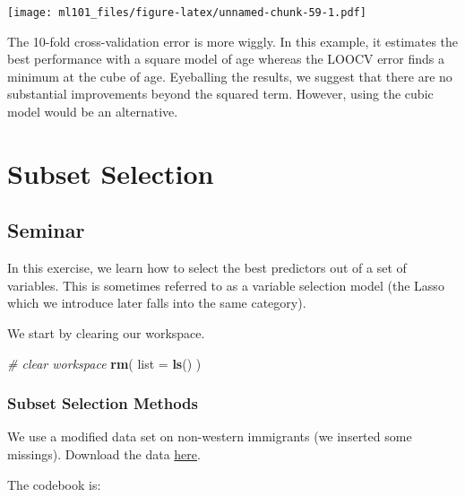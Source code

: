 \documentclass[]{article}
\newenvironment{Shaded}{\begin{snugshade}}{\end{snugshade}}
\newcommand{\CommentTok}[1]{\textcolor[rgb]{0.56,0.35,0.01}{\textit{#1}}}
\newcommand{\DataTypeTok}[1]{\textcolor[rgb]{0.13,0.29,0.53}{#1}}
\newcommand{\KeywordTok}[1]{\textcolor[rgb]{0.13,0.29,0.53}{\textbf{#1}}}
\newcommand{\NormalTok}[1]{#1}
\begin{document}
\texttt{[image: ml101\_files/figure-latex/unnamed-chunk-59-1.pdf]}

The 10-fold cross-validation error is more wiggly. In this example, it estimates the best performance with a square model of age whereas the LOOCV error finds a minimum at the cube of age. Eyeballing the results, we suggest that there are no substantial improvements beyond the squared term. However, using the cubic model would be an alternative.

\hypertarget{subset-selection}{%
\section{Subset Selection}\label{subset-selection}}

\hypertarget{seminar-2}{%
\subsection{Seminar}\label{seminar-2}}

In this exercise, we learn how to select the best predictors out of a set of variables. This is sometimes referred to as a variable selection model (the Lasso which we introduce later falls into the same category).

We start by clearing our workspace.

\begin{Shaded}
\begin{Highlighting}[]
\CommentTok{# clear workspace}
\KeywordTok{rm}\NormalTok{( }\DataTypeTok{list =} \KeywordTok{ls}\NormalTok{() )}
\end{Highlighting}
\end{Shaded}

\hypertarget{subset-selection-methods}{%
\subsubsection{Subset Selection Methods}\label{subset-selection-methods}}

We use a modified data set on non-western immigrants (we inserted some missings). Download the data \href{http://philippbroniecki.github.io/ML2017.io/data/BSAS_manip_missings.RData}{here}.

The codebook is:
\end{document}
